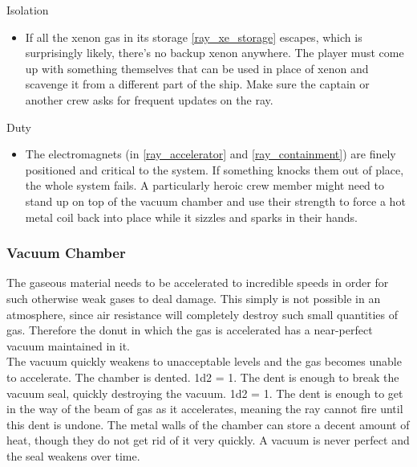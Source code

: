 \documentclass[a4paper]{article}
\begin{document}
\begin{minipage}[t]{0.4\linewidth}
Isolation
\begin{itemize}
\item If all the xenon gas in its storage \ref{ray_xe_storage} escapes, which is surprisingly likely, there's no backup xenon anywhere. The player must come up with something themselves that can be used in place of xenon and scavenge it from a different part of the ship. Make sure the captain or another crew asks for frequent updates on the ray.
\end{itemize}
\end{minipage}
\begin{minipage}[t]{0.4\linewidth}
Duty
\begin{itemize}
\item The electromagnets (in \ref{ray_accelerator} and \ref{ray_containment}) are finely positioned and critical to the system. If something knocks them out of place, the whole system fails. A particularly heroic crew member might need to stand up on top of the vacuum chamber and use their strength to force a hot metal coil back into place while it sizzles and sparks in their hands.
\end{itemize}
\end{minipage}

\hspace{-18pt} \subsubsection{Vacuum Chamber} \label{ray_chamber} \vspace{-0.2cm}
The gaseous material needs to be accelerated to incredible speeds in order for such otherwise weak gases to deal damage. This simply is not possible in an atmosphere, since air resistance will completely destroy such small quantities of gas. Therefore the donut in which the gas is accelerated has a near-perfect vacuum maintained in it.
\\ \pbhw
{The vacuum quickly weakens to unacceptable levels and the gas becomes unable to accelerate.}
{The chamber is dented. \newline 1d2 = 1. The dent is enough to break the vacuum seal, quickly destroying the vacuum. \newline 1d2 = 1. The dent is enough to get in the way of the beam of gas as it accelerates, meaning the ray cannot fire until this dent is undone.}
{The metal walls of the chamber can store a decent amount of heat, though they do not get rid of it very quickly.}
{A vacuum is never perfect and the seal weakens over time. }
\end{document}
